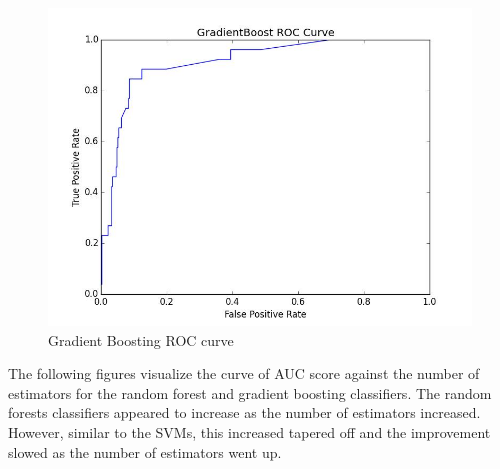 \documentclass{article} %
\begin{document}
\begin{figure}[h]
\centering
{\caption{Gradient Boosting ROC curve} \includegraphics[scale=0.4]{img/grad_roc.jpg}}
\end{figure}

The following figures visualize the curve of AUC score against the number of
estimators for the random forest and gradient boosting classifiers. The random
forests classifiers appeared to increase as the number of estimators increased.
However, similar to the SVMs, this increased tapered off and the improvement
slowed as the number of estimators went up.

\begin{figure}[h]
    \centering
    \qquad
\end{figure}
\end{document}
